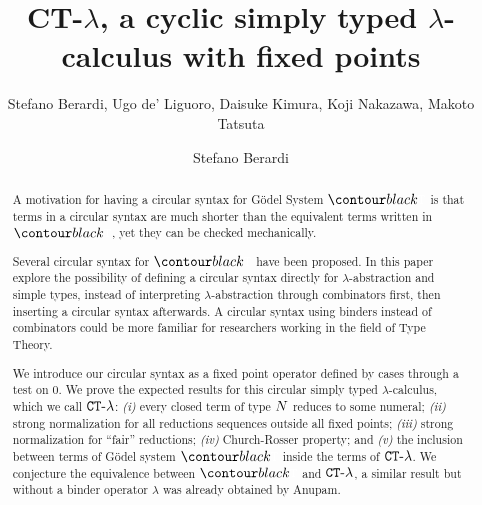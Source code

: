 \documentclass{article}
\begin{document}
\sloppy 
{}



\ifdraft

\title{CT-$\lambda$, a cyclic simply typed $\lambda$-calculus with fixed points}

\author{Stefano Berardi,  Ugo de' Liguoro, Daisuke Kimura, Koji Nakazawa, Makoto Tatsuta}
\date{}

\else

\title[Equivalence]{}

\author[S. Berardi]{Stefano Berardi}
\address{Universit\`{a} di Torino,
Torino, Italy}


\fi

\maketitle

\begin{abstract}
A motivation for having a circular syntax for G\"{o}del System $\systemT$ is that terms 
in a circular syntax are much shorter than the equivalent terms written in $\systemT$, 
yet they can be checked mechanically.

Several circular syntax for $\systemT$ have been proposed.
In this paper explore the possibility of defining a circular syntax
directly for $\lambda$-abstraction and simple types, instead of interpreting
 $\lambda$-abstraction through combinators first, then inserting a  circular syntax afterwards.
A circular syntax using binders instead of combinators
could be more familiar for researchers working in the field of Type Theory.

We introduce our circular syntax as a fixed point operator defined by cases through a test on $0$.
We prove the expected results for this circular simply typed $\lambda$-calculus, which we call ${ {\tt CT} \mbox{-} \lambda}$: 
\emph{(i)} every closed term of type ${N}$ reduces to some numeral;
\emph{(ii)}  strong normalization for all reductions sequences outside all fixed points; 
\emph{(iii)}  strong normalization for ``fair'' reductions; \emph{(iv)} Church-Rosser property;
and \emph{(v)} the inclusion between terms of G\"{o}del system $\systemT$
inside the terms of ${ {\tt CT} \mbox{-} \lambda}$. 
We conjecture the equivalence between $\systemT$ and ${ {\tt CT} \mbox{-} \lambda}$,
a similar result but without a binder operator $\lambda$ was already obtained by Anupam.



\end{abstract}
\end{document}
